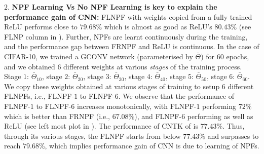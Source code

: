 $2.$ \textbf{NPF Learning Vs No NPF Learning  is key to explain the performance gain of CNN:} FLNPF with weights copied from a fully trained ReLU performs close to $79.68\%$ which is almost as good as ReLU's $80.43\%$ (see FLNP column in ). Further, NPFs are learnt continuously during the training, and the performance gap between FRNPF and ReLU is continuous. In the case of CIFAR-10, we trained a GCONV network (parameterised by $\bar{\Theta}$) for $60$ epochs, and we obtained $6$ different weights at various \emph{stages} of the training process. Stage $1$: $\bar{\Theta}_{10}$, stage $2$: $\bar{\Theta}_{20}$, stage $3$: $\bar{\Theta}_{30}$, stage $4$: $\bar{\Theta}_{40}$, stage $5$: $\bar{\Theta}_{50}$, stage $6$: $\bar{\Theta}_{60}$. We copy these weights obtained at various stages of training to setup $6$ different FLNPFs, i.e., FLNPF-$1$ to FLNPF-$6$. We observe that the performance of FLNPF-$1$ to FLNPF-$6$ increases monotonically, with FLNPF-$1$ performing $72\%$ which is better than FRNPF (i.e., $67.08\%$),  and FLNPF-$6$ performing as well as ReLU (see left most plot in ). The performance of CNTK of \cite{arora2019exact} is $77.43\%$. Thus, through its various stages, the FLNPF starts from below $77.43\%$ and surpasses to reach $79.68\%$, which implies performance gain of CNN is due to learning of NPFs.\\
